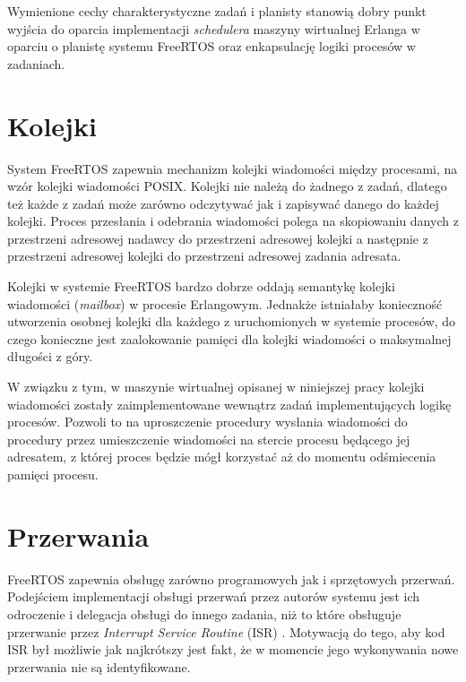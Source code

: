 Wymienione cechy charakterystyczne zadań i planisty stanowią dobry punkt wyjścia do oparcia implementacji \emph{schedulera} maszyny wirtualnej Erlanga w oparciu o planistę systemu FreeRTOS oraz enkapsulację logiki procesów w zadaniach.

\section{Kolejki}
\label{sec:rtosKolejki}

System FreeRTOS zapewnia mechanizm kolejki wiadomości między procesami, na wzór kolejki wiadomości POSIX. Kolejki nie należą do żadnego z zadań, dlatego też każde z zadań może zarówno odczytywać jak i zapisywać danego do każdej kolejki. Proces przesłania i odebrania wiadomości polega na skopiowaniu danych z przestrzeni adresowej nadawcy do przestrzeni adresowej kolejki a następnie z przestrzeni adresowej kolejki do przestrzeni adresowej zadania adresata.

Kolejki w systemie FreeRTOS bardzo dobrze oddają semantykę kolejki wiadomości (\emph{mailbox}) w procesie Erlangowym. Jednakże istniałaby konieczność utworzenia osobnej kolejki dla każdego z uruchomionych w systemie procesów, do czego konieczne jest zaalokowanie pamięci dla kolejki wiadomości o maksymalnej długości z góry. 

W związku z tym, w maszynie wirtualnej opisanej w niniejszej pracy kolejki wiadomości zostały zaimplementowane wewnątrz zadań implementujących logikę procesów. Pozwoli to na uproszczenie procedury wysłania wiadomości do procedury przez umieszczenie wiadomości na stercie procesu będącego jej adresatem, z której proces będzie mógł korzystać aż do momentu odśmiecenia pamięci procesu. 

\section{Przerwania}
\label{sec:rtosPrzerwania}

FreeRTOS zapewnia obsługę zarówno programowych jak i sprzętowych przerwań. Podejściem implementacji obsługi przerwań przez autorów systemu jest ich odroczenie i delegacja obsługi do innego zadania, niż to które obsługuje przerwanie przez \emph{Interrupt Service Routine} (ISR) \cite{Barry2011}. Motywacją do tego, aby kod ISR był możliwie jak najkrótszy jest fakt, że w momencie jego wykonywania nowe przerwania nie są identyfikowane.

